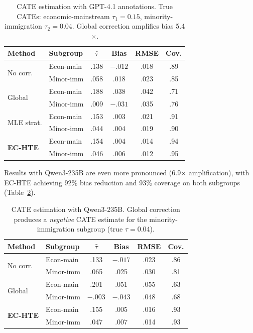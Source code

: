 \documentclass[11pt,a4paper]{article}
\begin{document}
\begin{table}[t]
\centering
\small
\setlength{\tabcolsep}{3pt}
\begin{tabular}{llcccc}
\toprule
Method & Subgroup & $\hat{\tau}$ & Bias & RMSE & Cov. \\
\midrule
\multirow{2}{*}{No corr.}
 & Econ-main & .138 & $-.012$ & .018 & .89 \\
 & Minor-imm & .058 & .018 & .023 & .85 \\
\midrule
\multirow{2}{*}{Global}
 & Econ-main & .188 & .038 & .042 & .71 \\
 & Minor-imm & .009 & $-.031$ & .035 & .76 \\
\midrule
\multirow{2}{*}{MLE strat.}
 & Econ-main & .153 & .003 & .021 & .91 \\
 & Minor-imm & .044 & .004 & .019 & .90 \\
\midrule
\multirow{2}{*}{\textbf{EC-HTE}}
 & Econ-main & .154 & .004 & .014 & .94 \\
 & Minor-imm & .046 & .006 & .012 & .95 \\
\bottomrule
\end{tabular}
\caption{CATE estimation with GPT-4.1 annotations. True CATEs: economic-mainstream $\tau_1 = 0.15$, minority-immigration $\tau_2 = 0.04$. Global correction amplifies bias 5.4$\times$.}
\label{tab:semisyn_gpt4}
\end{table}

Results with Qwen3-235B are even more pronounced (6.9$\times$ amplification), with EC-HTE achieving 92\% bias reduction and 93\% coverage on both subgroups (Table~\ref{tab:semisyn_qwen3}).

\begin{table}[t]
\centering
\small
\setlength{\tabcolsep}{3pt}
\begin{tabular}{llcccc}
\toprule
Method & Subgroup & $\hat{\tau}$ & Bias & RMSE & Cov. \\
\midrule
\multirow{2}{*}{No corr.}
 & Econ-main & .133 & $-.017$ & .023 & .86 \\
 & Minor-imm & .065 & .025 & .030 & .81 \\
\midrule
\multirow{2}{*}{Global}
 & Econ-main & .201 & .051 & .055 & .63 \\
 & Minor-imm & $-.003$ & $-.043$ & .048 & .68 \\
\midrule
\multirow{2}{*}{\textbf{EC-HTE}}
 & Econ-main & .155 & .005 & .016 & .93 \\
 & Minor-imm & .047 & .007 & .014 & .93 \\
\bottomrule
\end{tabular}
\caption{CATE estimation with Qwen3-235B. Global correction produces a \emph{negative} CATE estimate for the minority-immigration subgroup (true $\tau = 0.04$).}
\label{tab:semisyn_qwen3}
\end{table}
\end{document}
